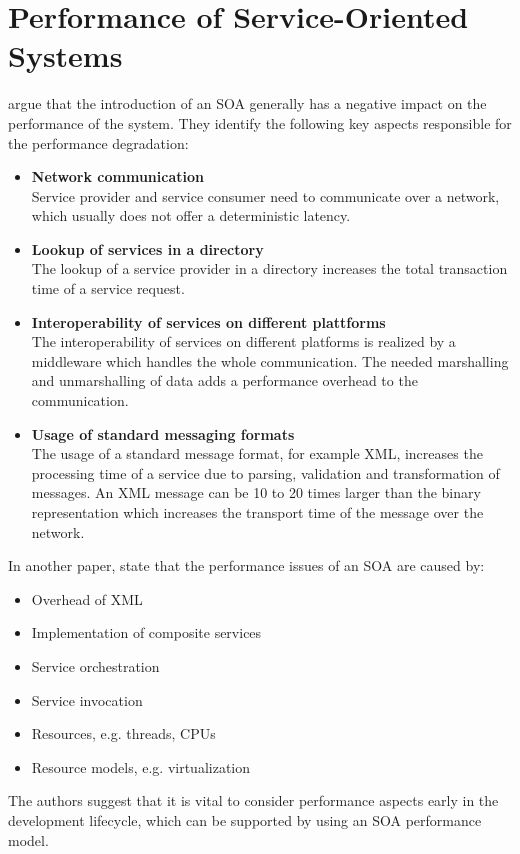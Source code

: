 \section{Performance of Service-Oriented Systems}
\citet{OBrien:2007fk} argue that the introduction of an SOA generally has a negative impact on the performance of the system. They identify the following key aspects responsible for the performance degradation:
\begin{itemize}
	\item \textbf{Network communication}\\
	Service provider and service consumer need to communicate over a network, which usually does not offer a deterministic latency.
	\item \textbf{Lookup of services in a directory}\\
	The lookup of a service provider in a directory increases the total transaction time of a service request.
	\item \textbf{Interoperability of services on different plattforms}\\
	The interoperability of services on different platforms is realized by a middleware which handles the whole communication. The needed marshalling and unmarshalling of data adds a performance overhead to the communication.
	\item \textbf{Usage of standard messaging formats}\\
	The usage of a standard message format, for example XML, increases the processing time of a service due to parsing, validation and transformation of messages. An XML message can be 10 to 20 times larger than the binary representation which increases the transport time of the message over the network.
\end{itemize}
In another paper, \citet{OBrien:2008uq} state that the performance issues of an SOA are caused by:
\begin{itemize}
	\item Overhead of XML
	\item Implementation of composite services
	\item Service orchestration
	\item Service invocation
	\item Resources, e.g. threads, CPUs
	\item Resource models, e.g. virtualization
\end{itemize}
The authors suggest that it is vital to consider performance aspects early in the development lifecycle, which can be supported by using an SOA performance model.

